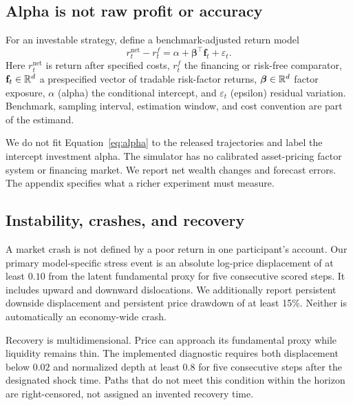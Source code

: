 \subsection{Alpha is not raw profit or accuracy}
For an investable strategy, define a benchmark-adjusted return model
\begin{equation}
r^{\mathrm{net}}_t-r^f_t=\alpha+\boldsymbol\beta^\top\mathbf f_t+\varepsilon_t.
\label{eq:alpha}
\end{equation}
Here $r^{\mathrm{net}}_t$ is return after specified costs, $r^f_t$ the financing or risk-free comparator, $\mathbf f_t\in\mathbb R^d$ a prespecified vector of tradable risk-factor returns, $\boldsymbol\beta\in\mathbb R^d$ factor exposure, $\alpha$ (alpha) the conditional intercept, and $\varepsilon_t$ (epsilon) residual variation. Benchmark, sampling interval, estimation window, and cost convention are part of the estimand.


We do not fit Equation~\eqref{eq:alpha} to the released trajectories and label the intercept investment alpha. The simulator has no calibrated asset-pricing factor system or financing market. We report net wealth changes and forecast errors. The appendix specifies what a richer experiment must measure.

\subsection{Instability, crashes, and recovery}
A market crash is not defined by a poor return in one participant's account. Our primary model-specific stress event is an absolute log-price displacement of at least $0.10$ from the latent fundamental proxy for five consecutive scored steps. It includes upward and downward dislocations. We additionally report persistent downside displacement and persistent price drawdown of at least 15\%. Neither is automatically an economy-wide crash.

Recovery is multidimensional. Price can approach its fundamental proxy while liquidity remains thin. The implemented diagnostic requires both displacement below $0.02$ and normalized depth at least $0.8$ for five consecutive steps after the designated shock time. Paths that do not meet this condition within the horizon are right-censored, not assigned an invented recovery time.

